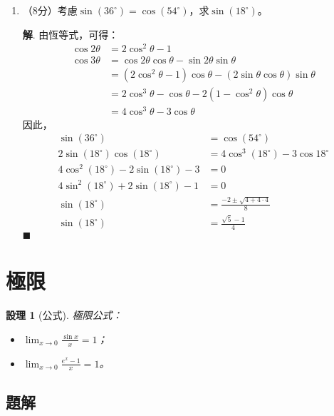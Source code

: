 \documentclass[12pt]{article}
\newtheorem*{proposition}{設理}
\newenvironment*{sol}{\par \textbf{解}.}{\hfill$\blacksquare$}
\begin{document}
\begin{enumerate}
\begin{sol}
            $\therefore$$P(n)$對所有整數$n$成立。
        \end{sol}
        \item （8分）考慮$\sin(36^\circ)=\cos(54^\circ)$，求$\sin(18^\circ)$。\begin{sol}
            由恆等式，可得：\begin{align*}
                \cos{2\theta}&=2\cos^2{\theta}-1\\
                \cos{3\theta}&=\cos{2\theta}\cos{\theta}-\sin{2\theta}\sin{\theta}\\
                &=(2\cos^2{\theta}-1)\cos{\theta}-(2\sin{\theta}\cos{\theta})\sin{\theta}\\
                &=2\cos^3{\theta}-\cos{\theta}-2(1-\cos^2{\theta})\cos{\theta}\\
                &=4\cos^3{\theta}-3\cos{\theta}
            \end{align*}
            因此，\begin{align*}
                \sin(36^\circ)&=\cos(54^\circ)\\
                2\sin(18^\circ)\cos(18^\circ)&=4\cos^3(18^\circ)-3\cos{18^\circ}\\
                4\cos^2(18^\circ)-2\sin(18^\circ)-3&=0\\
                4\sin^2(18^\circ)+2\sin(18^\circ)-1&=0\\
                \sin(18^\circ)&=\frac{-2\pm\sqrt{4+4\cdot 4}}{8}\\
                \sin(18^\circ)&=\frac{\sqrt{5}-1}{4}
            \end{align*}
        \end{sol}
    \end{enumerate}

    \section*{極限}

    \begin{proposition}[公式]
        極限公式：\begin{itemize}
            \item $\lim_{x\to 0}\frac{\sin{x}}{x}=1$；
            \item $\lim_{x\to 0}\frac{e^x-1}{x}=1$。
        \end{itemize}
    \end{proposition}

    \subsection*{題解}
\end{document}
